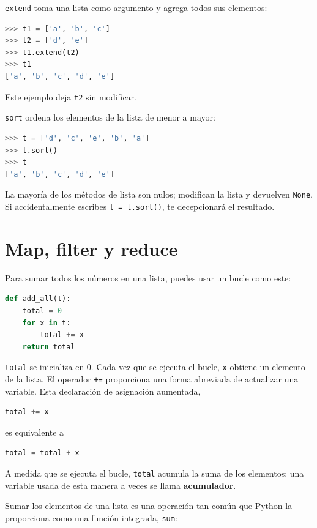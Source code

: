 \texttt{extend} toma una lista como argumento y agrega todos sus elementos:

\begin{lstlisting}[language=Python]
>>> t1 = ['a', 'b', 'c'] 
>>> t2 = ['d', 'e'] 
>>> t1.extend(t2) 
>>> t1 
['a', 'b', 'c', 'd', 'e']
\end{lstlisting}

Este ejemplo deja \texttt{t2} sin modificar.

\texttt{sort} ordena los elementos de la lista de menor a mayor:

\begin{lstlisting}[language=Python]
>>> t = ['d', 'c', 'e', 'b', 'a'] 
>>> t.sort() 
>>> t 
['a', 'b', 'c', 'd', 'e']
\end{lstlisting}

La mayoría de los métodos de lista son nulos; modifican la lista y devuelven \texttt{None}. Si accidentalmente escribes \texttt{t = t.sort()}, te decepcionará el resultado.

\section{Map, filter y reduce}

Para sumar todos los números en una lista, puedes usar un bucle como este:

\begin{lstlisting}[language=Python]
def add_all(t):
    total = 0
    for x in t:
        total += x
    return total
\end{lstlisting}

\texttt{total} se inicializa en 0. Cada vez que se ejecuta el bucle, \texttt{x} obtiene un elemento de la lista. El operador \texttt{+=} proporciona una forma abreviada de actualizar una variable. Esta declaración de asignación aumentada,

\begin{lstlisting}[language=Python]
total += x
\end{lstlisting}

es equivalente a

\begin{lstlisting}[language=Python]
total = total + x
\end{lstlisting}

A medida que se ejecuta el bucle, \texttt{total} acumula la suma de los elementos; una variable usada de esta manera a veces se llama \textbf{acumulador}.

Sumar los elementos de una lista es una operación tan común que Python la proporciona como una función integrada, \texttt{sum}:

